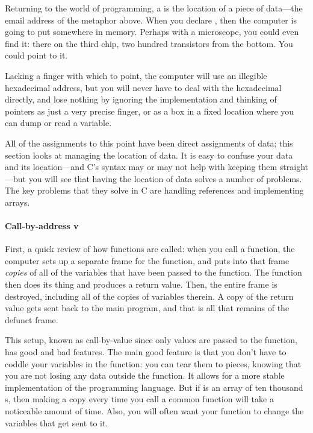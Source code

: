 Returning to the world of programming, 
a  is the location of a piece of
data---the email address of the metaphor above. When you
declare , then the computer is going to put  somewhere
in memory. Perhaps with a microscope, you could even find it: there on
the third chip, two hundred transistors from the bottom. You could point
to it.

Lacking a finger with which to point, the computer will use
an illegible hexadecimal address, but you will never have to deal with
the hexadecimal directly, and lose nothing by ignoring the implementation
and thinking of pointers as just a very precise finger, or as a box in a
fixed location where you can dump or read a variable.

All of the assignments to this point have been direct assignments of
data; this section looks at managing the location of data. It is easy to
confuse your data and its location---and C's syntax may or may not help
with keeping them straight---but you will see that having the location
of data solves a number of problems. The key problems that they solve
in C are handling references and implementing arrays.

\paragraph{Call-by-address v } 
  
First, a quick review of how functions are called: when you call a function,
the computer sets up a separate frame for the function, and puts into
that frame {\it copies} of all of the variables that have been passed
to the function. The function then does its thing and produces a return
value. Then, the entire frame is destroyed, including all of the copies
of variables therein. A copy of the return value gets sent back to the
main program, and that is all that remains of the defunct frame.

This setup, known as call-by-value since only values are passed to the
function, has good and bad features. The main good feature is that you
don't have to coddle your variables in the function: you can tear them to
pieces, knowing that you are not losing any data outside the function. It
allows for a more stable implementation of the programming language. But if 
is an array of ten thousand s, then making a copy every time
you call a common function will take a noticeable amount of time. Also,
you will often want your function to change the variables that get
sent to it.

